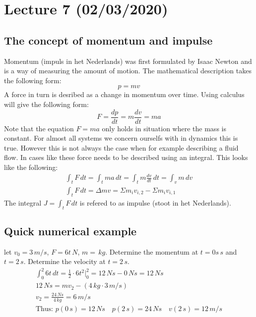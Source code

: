 \documentclass[11pt, a4paper]{article}
\begin{document}
\setcounter{section}{6}
\section{Lecture 7 (02/03/2020)}

\subsection{The concept of momentum and impulse}
Momentum (impuls in het Nederlands) was first formulated by Isaac Newton and is a way of measuring the amount of motion. The mathematical
description takes the following form:
\begin{equation}
  p = mv
\end{equation}
A force in turn is desribed as a change in momentum over time. Using calculus will give the following form:
\begin{equation}
  F = \frac{dp}{dt} = m\frac{dv}{dt} = ma
\end{equation}
Note that the equation $F = ma$ only holds in situation where the mass is constant. For almost all systems
we concern ourselfs with in dynamics this is true. However this is not always the case when for example
describing a fluid flow. In cases like these force needs to be described using an integral. This looks
like the following:
\begin{gather}
  \int_t F\,dt = \int_t ma\,dt = \int_t m\frac{dv}{dt}\,dt = \int_v m\,dv\\
  \int_t F\,dt = \Delta mv = \Sigma m_iv_{i,2} - \Sigma m_iv_{i,1}
\end{gather}
The integral $J = \int_t F\,dt$ is refered to as impulse (stoot in het Nederlands).

\subsection{Quick numerical example}
let $v_0 = 3\,m/s$, $F = 6t\,N$, $m =\,kg$. Determine the momentum at $t=0s\,s$ and $t=2\,s$. Determine the velocity at $t=2\,s$.
\begin{gather*}
  \int_0^2 6t\,dt = \frac{1}{2} \cdot 6 t^2\Big|_{0}^{2} = 12\,Ns - 0\,Ns = 12\,Ns\\
  12\,Ns = mv_2 - (4\,kg\cdot 3\,m/s)\\
  v_2 = \frac{24\,Ns}{4\,kg} = 6\,m/s\\
  \text{Thus: } p(0\,s) = 12\,Ns \quad  p(2\,s) = 24\,Ns \quad  v(2\,s) = 12\,m/s
\end{gather*}
\end{document}
